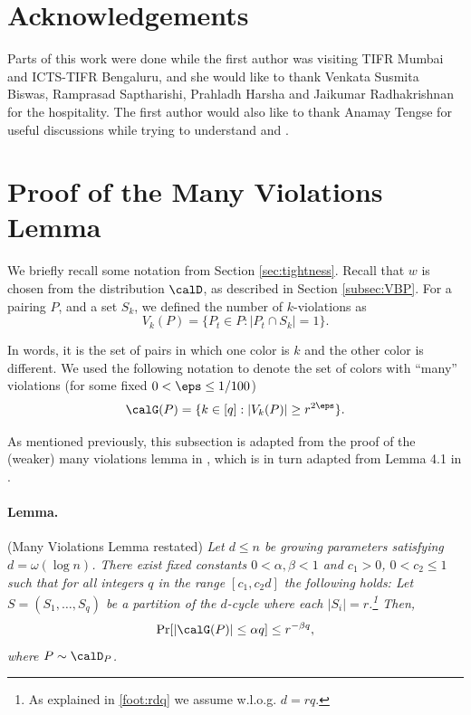 \documentclass{article}
\begin{document}
\section*{Acknowledgements}
Parts of this work were done while the first author was visiting TIFR Mumbai and ICTS-TIFR Bengaluru, and she would like to thank Venkata Susmita Biswas, Ramprasad Saptharishi, Prahladh Harsha and Jaikumar Radhakrishnan for the hospitality. 
The first author would also like to thank Anamay Tengse for useful discussions while trying to understand \cite{RR20} and \cite{GR21}.





\appendix
\section{Proof of the Many Violations Lemma}\label{sec:app}
We briefly recall some notation from Section \ref{sec:tightness}. Recall that $w$ is chosen from the distribution $\calD$, as described in Section \ref{subsec:VBP}. For a pairing $P$, and a set $S_k$, we defined the number of $k$-violations as
$$
V_k(P) = \{P_t \in P : |P_t \cap S_k| = 1\}.
$$

In words, it is the set of pairs in which one color is $k$ and the other color is different. We used the following notation to denote the set of colors with ``many'' violations (for some fixed $0<\eps\leq 1/100$)
$$
\calG(P) = \{k \in [q] : |V_k(P)| \geq r^{2\eps}\}.
$$

As mentioned previously, this subsection is adapted from the proof of the (weaker) many violations lemma in \cite{KushS23}, which is in turn adapted from Lemma 4.1 in \cite{DvirMPY12}. 

\paragraph{Lemma.}(Many Violations Lemma restated) \textit{Let $d\leq n$ be growing parameters satisfying $d = \omega(\log n)$. There exist fixed constants 
$0<\alpha,\beta<1$ and $c_1>0$, $0<c_2\leq 1$ such that for all integers $q$ in the range $ [c_1,c_2d] $ the following holds:
Let $S = (S_1, \ldots, S_q)$ be a partition of the $d$-cycle where each $|S_i| = r$.\footnote{As explained in \autoref{foot:rdq} we assume w.l.o.g. $d=rq$.}
Then,
$$
\Pr[|\calG(P)| \leq \alpha q] \leq r^{-\beta q},
$$
where $P\sim \calD_P$.}
\end{document}
